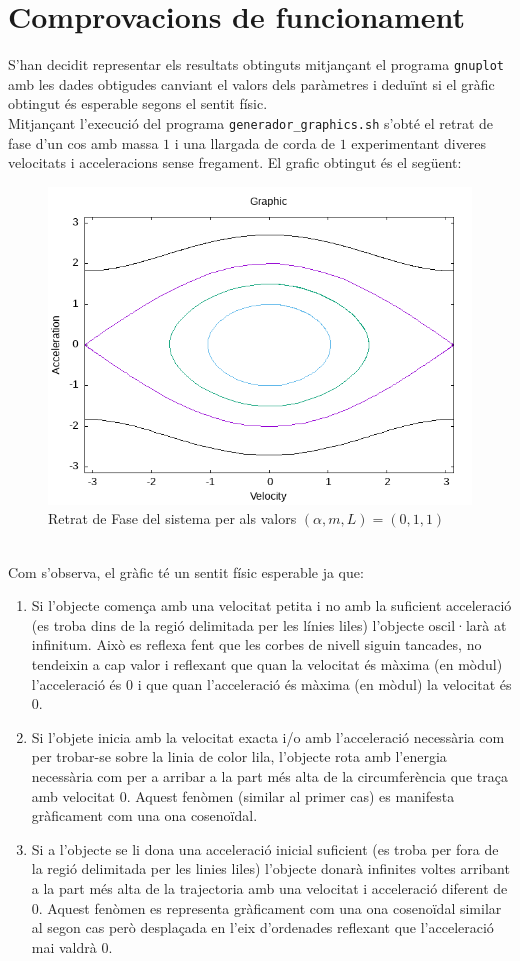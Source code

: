 \documentclass[a4paper, 11pt]{article}
\begin{document}
\section{Comprovacions de funcionament} \label{comprovacions}
S'han decidit representar els resultats obtinguts mitjançant el programa \texttt{gnuplot} amb les dades obtigudes canviant el valors dels paràmetres i deduïnt si el gràfic obtingut és esperable segons el sentit físic.\\
Mitjançant l'execució del programa \texttt{generador\_graphics.sh} s'obté el retrat de fase d'un cos amb massa $1$ i una llargada de corda de $1$ experimentant diveres velocitats i acceleracions sense fregament. El grafic obtingut és el següent:\\
\begin{figure}[h]
    \centering
    \includegraphics[width = 0.8 \textwidth]{ojoxd.PNG}
    \caption{Retrat de Fase del sistema per als valors $(\alpha, m, L) = (0, 1, 1)$}
    \label{retrat_fase}
\end{figure}
\\
Com s'observa, el gràfic té un sentit físic esperable ja que:
\begin{enumerate}
    \item Si l'objecte comença amb una velocitat petita i no amb la suficient acceleració (es troba dins de la regió delimitada per les línies liles) l'objecte oscil·larà at infinitum. Això es reflexa fent que les corbes de nivell siguin tancades, no tendeixin a cap valor i reflexant que quan la velocitat és màxima (en mòdul) l'acceleració és $0$ i que quan l'acceleració és màxima (en mòdul) la velocitat és $0$.
    \item Si l'objete inicia amb la velocitat exacta i/o amb l'acceleració necessària com per trobar-se sobre la linia de color lila, l'objecte rota amb l'energia necessària com per a arribar a la part més alta de la circumferència que traça amb velocitat $0$. Aquest fenòmen (similar al primer cas) es manifesta gràficament com una ona cosenoïdal.
    
    \item Si a l'objecte se li dona una acceleració inicial suficient (es troba per fora de la regió delimitada per les linies liles) l'objecte donarà infinites voltes arribant a la part més alta de la trajectoria amb una velocitat i acceleració diferent de $0$. Aquest fenòmen es representa gràficament com una ona cosenoïdal similar al segon cas però desplaçada en l'eix d'ordenades reflexant que l'acceleració mai valdrà $0$.
\end{enumerate}
\end{document}
